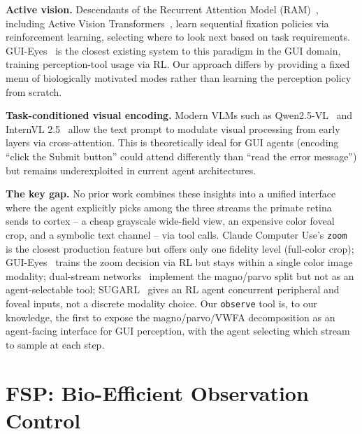 \documentclass[11pt,a4paper]{article}
\begin{document}
\textbf{Active vision.} Descendants of the Recurrent Attention Model (RAM)~\cite{mnih-ram}, including Active Vision Transformers~\cite{active-vit}, learn sequential fixation policies via reinforcement learning, selecting where to look next based on task requirements. GUI-Eyes~\cite{gui-eyes} is the closest existing system to this paradigm in the GUI domain, training perception-tool usage via RL. Our approach differs by providing a fixed menu of biologically motivated modes rather than learning the perception policy from scratch.

\textbf{Task-conditioned visual encoding.} Modern VLMs such as Qwen2.5-VL~\cite{qwen25-vl} and InternVL 2.5~\cite{internvl-25} allow the text prompt to modulate visual processing from early layers via cross-attention. This is theoretically ideal for GUI agents (encoding ``click the Submit button'' could attend differently than ``read the error message'') but remains underexploited in current agent architectures.

\textbf{The key gap.} No prior work combines these insights into a unified interface where the agent explicitly picks among the three streams the primate retina sends to cortex -- a cheap grayscale wide-field view, an expensive color foveal crop, and a symbolic text channel -- via tool calls. Claude Computer Use's \texttt{zoom}~\cite{claude-computer-use} is the closest production feature but offers only one fidelity level (full-color crop); GUI-Eyes~\cite{gui-eyes} trains the zoom decision via RL but stays within a single color image modality; dual-stream networks~\cite{choi-dualstream-neurips23,ibrayev-twostream-foveation} implement the magno/parvo split but not as an agent-selectable tool; SUGARL~\cite{sugarl} gives an RL agent concurrent peripheral and foveal inputs, not a discrete modality choice. Our \texttt{observe} tool is, to our knowledge, the first to expose the magno/parvo/VWFA decomposition as an agent-facing interface for GUI perception, with the agent selecting which stream to sample at each step.



\section{FSP: Bio-Efficient Observation Control}
\label{sec:method}
\end{document}
